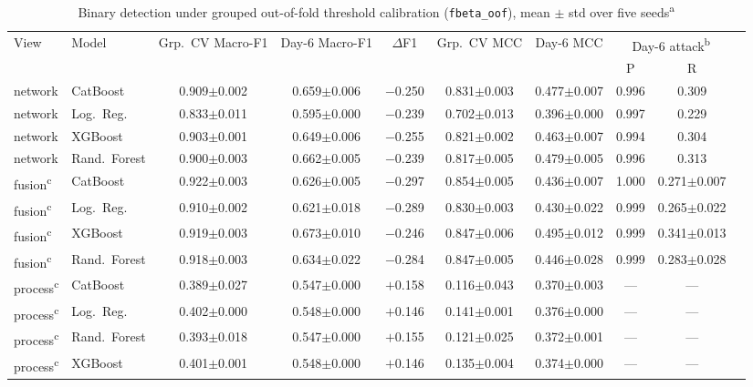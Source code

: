 \documentclass[conference]{IEEEtran}
\begin{document}
\begin{table}[t]
\caption{Binary detection under grouped out-of-fold threshold calibration (\texttt{fbeta\_oof}), mean
$\pm$ std over five seeds\textsuperscript{a}}
\label{tab:main}
\centering
\small
\begin{tabular}{llcccccccc}
\toprule
View & Model & Grp.\ CV Macro-F1 & Day-6 Macro-F1 & $\Delta$F1 & Grp.\ CV MCC & Day-6 MCC &
\multicolumn{2}{c}{Day-6 attack\textsuperscript{b}} \\
\cmidrule(lr){8-9}
 & & & & & & & P & R \\
\midrule
network & CatBoost      & 0.909$\pm$0.002 & 0.659$\pm$0.006 & $-$0.250 & 0.831$\pm$0.003 & 0.477$\pm$0.007 & 0.996 & 0.309 \\
network & Log.\ Reg.    & 0.833$\pm$0.011 & 0.595$\pm$0.000 & $-$0.239 & 0.702$\pm$0.013 & 0.396$\pm$0.000 & 0.997 & 0.229 \\
network & XGBoost       & 0.903$\pm$0.001 & 0.649$\pm$0.006 & $-$0.255 & 0.821$\pm$0.002 & 0.463$\pm$0.007 & 0.994 & 0.304 \\
network & Rand.\ Forest & 0.900$\pm$0.003 & 0.662$\pm$0.005 & $-$0.239 & 0.817$\pm$0.005 & 0.479$\pm$0.005 & 0.996 & 0.313 \\
fusion\textsuperscript{c} & CatBoost      & 0.922$\pm$0.003 & 0.626$\pm$0.005 & $-$0.297 & 0.854$\pm$0.005 & 0.436$\pm$0.007 & 1.000 & 0.271$\pm$0.007 \\
fusion\textsuperscript{c} & Log.\ Reg.    & 0.910$\pm$0.002 & 0.621$\pm$0.018 & $-$0.289 & 0.830$\pm$0.003 & 0.430$\pm$0.022 & 0.999 & 0.265$\pm$0.022 \\
fusion\textsuperscript{c} & XGBoost       & 0.919$\pm$0.003 & 0.673$\pm$0.010 & $-$0.246 & 0.847$\pm$0.006 & 0.495$\pm$0.012 & 0.999 & 0.341$\pm$0.013 \\
fusion\textsuperscript{c} & Rand.\ Forest & 0.918$\pm$0.003 & 0.634$\pm$0.022 & $-$0.284 & 0.847$\pm$0.005 & 0.446$\pm$0.028 & 0.999 & 0.283$\pm$0.028 \\
process\textsuperscript{c} & CatBoost      & 0.389$\pm$0.027 & 0.547$\pm$0.000 & $+$0.158 & 0.116$\pm$0.043 & 0.370$\pm$0.003 & --- & --- \\
process\textsuperscript{c} & Log.\ Reg.    & 0.402$\pm$0.000 & 0.548$\pm$0.000 & $+$0.146 & 0.141$\pm$0.001 & 0.376$\pm$0.000 & --- & --- \\
process\textsuperscript{c} & Rand.\ Forest & 0.393$\pm$0.018 & 0.547$\pm$0.000 & $+$0.155 & 0.121$\pm$0.025 & 0.372$\pm$0.001 & --- & --- \\
process\textsuperscript{c} & XGBoost       & 0.401$\pm$0.001 & 0.548$\pm$0.000 & $+$0.146 & 0.135$\pm$0.004 & 0.374$\pm$0.000 & --- & --- \\
\bottomrule
\end{tabular}


\end{table}
\end{document}
